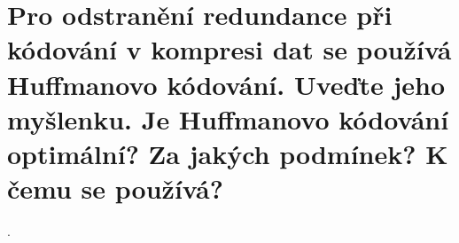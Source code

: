 \section{Pro odstranění redundance při kódování v kompresi dat se používá Huffmanovo kódování. Uveďte jeho myšlenku. Je 
Huffmanovo kódování optimální? Za jakých podmínek? K čemu se používá?}.